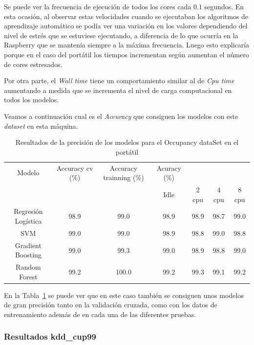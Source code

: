\documentclass[a4paper, 12pt]{book}
\begin{document}
Se puede ver la frecuencia de ejecución de todos los cores cada $0.1$ segundos. En esta ocasión, al observar estas velocidades cuando se ejecutaban los algoritmos de aprendizaje automático se podía ver una variación en los valores dependiendo del nivel de estrés que se estuviese ejecutando, a diferencia de lo que ocurría en la Raspberry que se mantenía siempre a la máxima frecuencia. Luego esto explicaría porque en el caso del portátil los tiempos incrementan según aumentan el número de cores estresados. 


Por otra parte, el \textit{Wall time} tiene un comportamiento similar al de \textit{Cpu time} aumentando a medida que se incrementa el nivel de carga computacional en todos los modelos.

Veamos a continuación cual es el \textit{Accuracy} que consiguen los modelos con este \textit{dataset} en esta máquina.

\begin{table}[]
\begin{adjustbox}{width=\textwidth}
\centering
    \begin{tabular}{c  c  c  c  c  c  c}
    \hline
    Modelo & Accuracy cv (\%) & Accuracy trainning (\%) & Acuracy (\%) & & & \\
    \cline{4-7}
      &  &   &  Idle & 2 cpu & 4 cpu & 8 cpu \\
     \hline
     Regresión Logística & 98.9 & 99.0 & 98.9 & 98.9 & 98.7 & 99.0\\
     SVM & 99.0 & 99.0 & 98.9 & 98.8 & 99.0 & 98.8\\
     Gradient Boosting & 99.0 & 99.3 & 99.0 & 98.9 & 98.8 & 99.0\\
     Random Forest & 99.2 & 100.0 & 99.2 & 99.3 & 99.1 & 99.2\\
    \hline
    \end{tabular}
\end{adjustbox}
\caption{Resultados de la precisión de los modelos para el Occupancy dataSet en el portátil}
\label{tab:acc_Occpc}
\end{table}

En la Tabla~\ref{tab:acc_Occpc} se puede ver que en este caso también se consiguen unos modelos de gran precisión tanto en la validación cruzada, como con los datos de entrenamiento además de en cada una de las diferentes pruebas.

\subsubsection{Resultados kdd\_cup99}
\label{subsubsec:kdd_pc}
\end{document}
